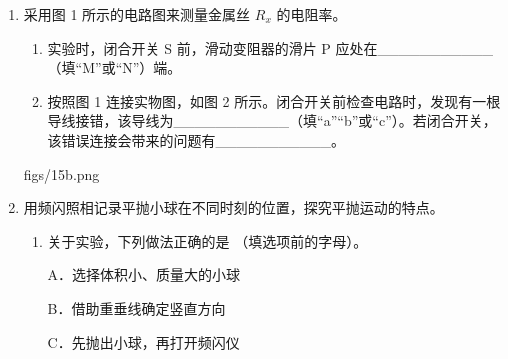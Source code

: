 \documentclass[\gkver]{gaokaozhenti}
\begin{document}
\begin{enumerate}
\item
采用图 1 所示的电路图来测量金属丝 $R_{x}$ 的电阻率。
\begin{enumerate}
	\item
	实验时，闭合开关 S 前，滑动变阻器的滑片 P 应处在\_\_\_\_\_\_\_\_\_\_\_（填“M”或“N”）端。
	\item
	按照图 1 连接实物图，如图 2 所示。闭合开关前检查电路时，发现有一根导线接错，该导线为\_\_\_\_\_\_\_\_\_\_\_（填“a”“b”或“c”）。若闭合开关，该错误连接会带来的问题有\_\_\_\_\_\_\_\_\_\_\_。
\end{enumerate}
{figs/15b.png}

\item
用频闪照相记录平抛小球在不同时刻的位置，探究平抛运动的特点。
\begin{enumerate}
	\item
	关于实验，下列做法正确的是  （填选项前的字母）。

	A．选择体积小、质量大的小球

	B．借助重垂线确定竖直方向

	C．先抛出小球，再打开频闪仪


\end{enumerate}
\end{enumerate}
\end{document}
